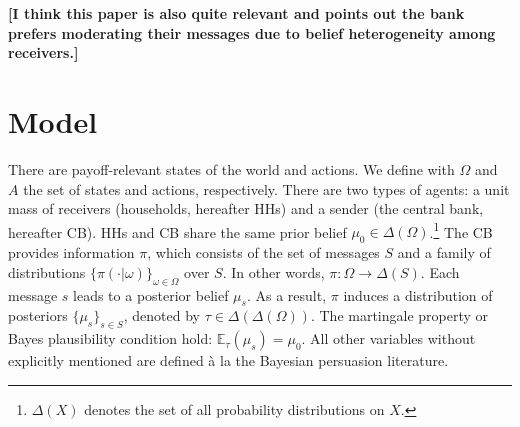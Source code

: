 \documentclass[12pt,a4paper]{article}
\begin{document}
\textbf{[I think this paper is also quite relevant and points out the bank prefers moderating their messages due to belief heterogeneity among receivers.]}

\section{Model}

There are payoff-relevant states of the world and actions. We define with $\Omega$ and $A$ the set of states and actions, respectively. There are two types of agents: a unit mass of receivers (households, hereafter HHs) and a sender (the central bank, hereafter CB). HHs and CB share the same prior belief $\mu_0 \in \Delta(\Omega)$.\footnote{$\Delta(X)$ denotes the set of all probability distributions on $X$.} The CB provides information $\pi$, which consists of the set of messages $S$ and a family of distributions $\{\pi(\cdot|\omega)\}_{\omega\in\Omega}$ over $S$. In other words, $\pi: \Omega \to \Delta(S)$. Each message $s$ leads to a posterior belief $\mu_s$. As a result, $\pi$ induces a distribution of posteriors $\{\mu_s\}_{s \in S}$, denoted by $\tau \in \Delta(\Delta(\Omega))$. The martingale property or Bayes plausibility condition hold: $\mathbb{E}_{\tau}(\mu_s)=\mu_0$. All other variables without explicitly mentioned are defined \`{a} la the Bayesian persuasion literature.
\end{document}
